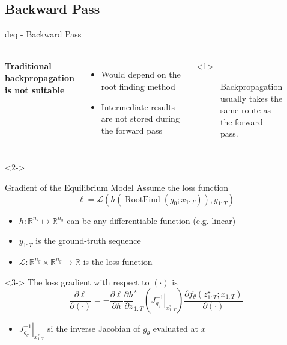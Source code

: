 \documentclass[8pt, t,
aspectratio=169,%
]{beamer}
\begin{document}
\subsection{Backward Pass}
\begin{frame}{\Acrlong{deq} - Backward Pass}
    \framesubtitle{\cite{bai2019deep}}
    \begin{columns}[T]
            \textbf{Traditional backpropagation is not suitable}
                \begin{itemize}
                    \item Would depend on the root finding method
                    \item Intermediate results are not stored during the forward pass
                \end{itemize}
        \begin{onlyenv}<1>
            \begin{figure}
                
                \caption{Backpropagation usually takes the same route as the forward pass.}
            \end{figure}
        \end{onlyenv}

        
    \end{columns}
    \begin{onlyenv}<2->
        \begin{block}{Gradient of the Equilibrium Model}
            Assume the loss function
             $$\ell=\mathcal{L}\left(h\left(\operatorname{RootFind}\left(g_0 ; x_{1:T}\right)\right), y_{1: T}\right)$$
            \begin{itemize}
                \item $h:\mathbb{R}^{n_z} \mapsto \mathbb{R}^{n_y}$ can be any differentiable function (e.g. linear)
                \item $y_{1:T}$ is the ground-truth sequence
                \item $\mathcal{L}:\mathbb{R}^{n_y}\times\mathbb{R}^{n_y} \mapsto \mathbb{R}$ is the loss function
            \end{itemize}
            \begin{onlyenv}<3->
                The loss gradient with respect to $(\cdot)$ is
                $$\frac{\partial \ell}{\partial(\cdot)}=-\frac{\partial \ell}{\partial h} \frac{\partial h}{\partial z}_{1: T}^{\star}\left(\left.J_{g_\theta}^{-1}\right|_{{x}_{1: T}^*}\right) \frac{\partial f_\theta\left(z_{1: T}^{\star} ; x_{1: T}\right)}{\partial(\cdot)}$$
                \begin{itemize}
                    \item $\left.J_{g_\theta}^{-1}\right|_{{x}_{1: T}^*}$ si the inverse Jacobian of $g_{\theta}$ evaluated at $x$
                \end{itemize}
            \end{onlyenv}
        \end{block}
    \end{onlyenv}

    
\end{frame}
\end{document}
